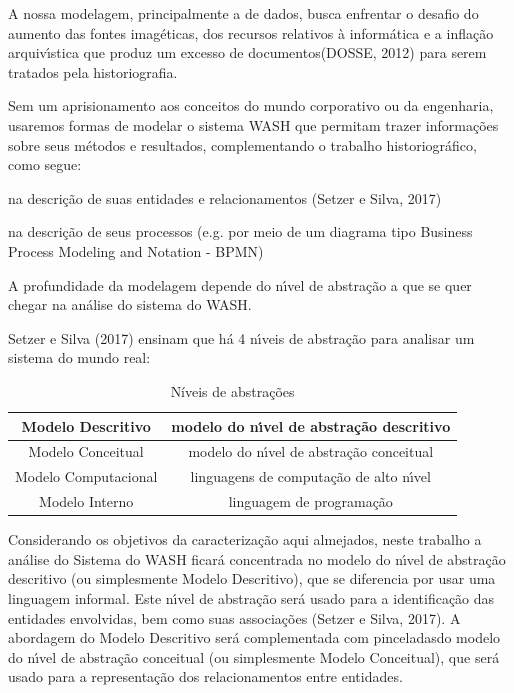 \documentclass[
12pt,		%
openright,	%
twoside,  %
a4paper,			%
chapter=TITLE,		%
english,			%
french,				%
spanish,			%
brazil				%
]{USPSC-classe/USPSC}
\begin{document}
A nossa modelagem, principalmente a de dados, busca enfrentar o desafio do \textquotedbl aumento das fontes imag\'eticas, dos recursos relativos \`a inform\'atica e a infla\c{c}\~ao arquiv\'{\i}stica que produz um excesso de documentos\textquotedbl   (DOSSE, 2012) para serem tratados pela historiografia.




Sem um aprisionamento aos conceitos do mundo corporativo ou da engenharia, usaremos formas de modelar o sistema WASH que permitam trazer informa\c{c}\~oes sobre seus m\'etodos e resultados, complementando o trabalho historiogr\'afico, como segue:





\begin{alineas}
\item na descri\c{c}\~ao de suas entidades e relacionamentos (Setzer e Silva, 2017)
\item na descri\c{c}\~ao de seus processos (e.g. por meio de um diagrama tipo Business Process Modeling and Notation - BPMN)
\end{alineas}

A profundidade da modelagem depende do n\'{\i}vel de abstra\c{c}\~ao a que se quer chegar na an\'alise do sistema do WASH.




Setzer e Silva (2017) ensinam que h\'a 4 n\'{\i}veis de abstra\c{c}\~ao para analisar um sistema do mundo real:








\begin{table}[htb]
\tiny
\caption{\label{98b39a827ce08562e7aeba26851f8d86d1af7179}N\'{i}veis de abstra\c{c}\~oes}

\centering
\begin{tabular}{|c|c|}
\hline
Modelo Descritivo  &  modelo do n\'{\i}vel de abstra\c{c}\~ao descritivo \\
\hline
Modelo Conceitual  &  modelo do n\'{\i}vel de abstra\c{c}\~ao conceitual \\
\hline
Modelo Computacional  &  linguagens de computa\c{c}\~ao de alto n\'{\i}vel \\
\hline
Modelo Interno  &  linguagem de programa\c{c}\~ao \\
\hline
\end{tabular}
\end{table}


Considerando os objetivos da caracteriza\c{c}\~ao aqui almejados, neste trabalho a an\'alise do Sistema do WASH ficar\'a concentrada no modelo do n\'{\i}vel de abstra\c{c}\~ao descritivo (ou simplesmente Modelo Descritivo), que se diferencia por usar uma linguagem informal. Este n\'{\i}vel de abstra\c{c}\~ao ser\'a usado para a identifica\c{c}\~ao das entidades envolvidas, bem como suas associa\c{c}\~oes  (Setzer e Silva, 2017). A abordagem do Modelo Descritivo ser\'a complementada com \textquotedbl pinceladas\textquotedbl  do modelo do n\'{\i}vel de abstra\c{c}\~ao conceitual (ou simplesmente Modelo Conceitual), que ser\'a usado para a representa\c{c}\~ao dos relacionamentos entre entidades.
\end{document}

